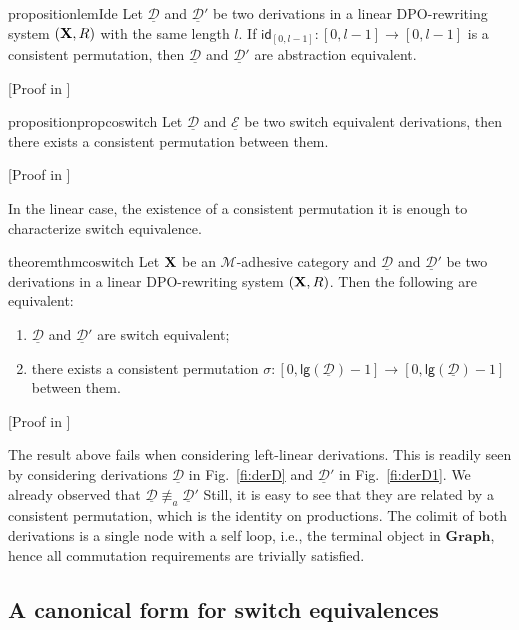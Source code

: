 \documentclass[a4paper,UKenglish,cleveref,pdftex,thm-restate,numberwithinsect,anonymous]{lipics}
\newcommand{\cat}[1]{\ensuremath{\mathbf{#1}}}
\newcommand{\id}[1]{\mathsf{id}_{#1}}
\def\R{\mathsf{R}}
\def\X{\textbf {\textup{X}}}
\newcommand{\dder}[1]{\mathscr{#1}}
\newcommand{\der}[1]{\underline{\dder{#1}}}
\newcommand{\lgh}[0]{\mathsf{lg}}
\begin{document}
\begin{restatable}{proposition}{lemIde}\label{lem:ide}
	Let $\der{D}$ and $\der{D}'$ be two derivations in a linear DPO-rewriting system $(\X, \R)$ with the same length $l$. If $\id{[0,l-1]}:[0,l-1]\to [0,l-1]$ is a consistent permutation, then $\der{D}$ and $\der{D}'$ are abstraction equivalent.  
\end{restatable}
[Proof in ]


\begin{restatable}{proposition}{propcoswitch}\label{prop:coswitch}
Let $\der{D}$ and $\der{E}$ be two switch equivalent derivations, then there exists a consistent permutation between them.
\end{restatable}	
[Proof in ]

In the linear case, the existence of a consistent permutation it is enough to characterize switch equivalence. 


\begin{restatable}{theorem}{thmcoswitch}
Let $\X$ be an $\mathcal{M}$-adhesive category and 
$\der{D}$ and $\der{D}'$ be two derivations in a linear DPO-rewriting system $(\X, \R)$. 
Then the following are equivalent:
\begin{enumerate}
	\item $\der{D}$ and $\der{D}'$ are switch equivalent;
	\item there exists a consistent permutation $\sigma\colon [0,\lgh(\der{D})-1]\to [0,\lgh(\der{D})-1]$ between them.
\end{enumerate}
\end{restatable}
[Proof in ]


\begin{example}
  The result above fails when considering left-linear
  derivations. This is readily seen by considering derivations
  $\der{D}$ in Fig.~\ref{fi:derD} and $\der{D}'$ in
  Fig.~\ref{fi:derD1}. We already observed that
  $\der{D} \not\equiv_a \der{D}'$
  Still, it is easy to see that they are related by a consistent
  permutation, which is the identity on productions. The colimit of
  both derivations is a single node with a self loop, i.e., the
  terminal object in $\cat{Graph}$, hence all commutation requirements
  are trivially satisfied.
\end{example}

\fi 
\subsection{A canonical form for  switch equivalences}
\label{subsec:canonical}
\end{document}
